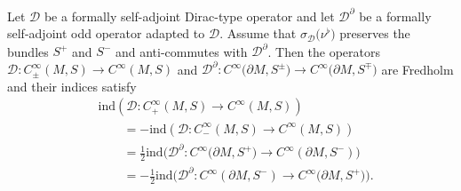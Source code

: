 \begin{Theorem}\label{thm:HolIndex}
Let $\mathcal{D}$ be a formally self-adjoint Dirac-type operator and let $\mathcal{D}^\partial$ be a formally self-adjoint odd operator adapted to $\mathcal{D}$.
Assume that $\sigma_{\mathcal{D}}\big(\nu^\flat\big)$ preserves the bundles $S^+$ and $S^-$ and anti-commutes with $\mathcal{D}^\partial$.
Then the operators $\mathcal{D}\colon C^\infty_\pm(M,S)\to C^\infty(M,S)$ and $\mathcal{D}^\partial\colon C^\infty\big(\partial M,S^\pm\big)\to C^\infty\big(\partial M,S^\mp\big)$ are Fredholm and their indices satisfy
\begin{align}
&\mathrm{ind}(\mathcal{D}\colon C^\infty_+(M,S) \to C^\infty(M,S)) \nonumber \\
&\qquad=
-\mathrm{ind}(\mathcal{D}\colon C^\infty_-(M,S)\to C^\infty(M,S)) \label{eq:ind1}\\
&\qquad=
\frac{1}{2} \mathrm{ind}\big(\mathcal{D}^\partial\colon C^\infty\big(\partial M,S^+\big)\to C^\infty(\partial M,S^-)\big) \label{eq:ind2}\\
&\qquad=
-\frac{1}{2} \mathrm{ind}\big(\mathcal{D}^\partial\colon C^\infty(\partial M,S^-)\to C^\infty\big(\partial M,S^+\big)\big) .\label{eq:ind3}
\end{align}
\end{Theorem}

